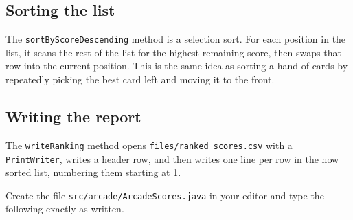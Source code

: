 \documentclass[11pt]{article}
\begin{document}
\subsection{Sorting the list}
The \texttt{sortByScoreDescending} method is a selection sort. For each
position in the list, it scans the rest of the list for the highest
remaining score, then swaps that row into the current position. This is the
same idea as sorting a hand of cards by repeatedly picking the best card
left and moving it to the front.

\subsection{Writing the report}
The \texttt{writeRanking} method opens \texttt{files/ranked\_scores.csv}
with a \texttt{PrintWriter}, writes a header row, and then writes one line
per row in the now sorted list, numbering them starting at 1.

Create the file \texttt{src/arcade/ArcadeScores.java} in your editor and
type the following exactly as written.
\end{document}
